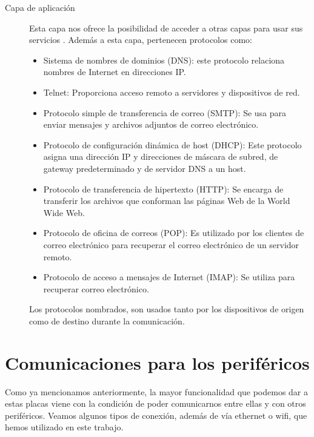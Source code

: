 \begin{description}
\item[Capa de aplicación]
Esta capa nos ofrece la posibilidad de acceder a otras capas para usar sus servicios \cite{protocolosAplicacion}. Además a esta capa, pertenecen protocolos como:
\begin{itemize}
\item Sistema de nombres de dominios (DNS): este protocolo relaciona nombres de Internet en direcciones IP.
\item Telnet: Proporciona acceso remoto a servidores y dispositivos de red.
\item Protocolo simple de transferencia de correo (SMTP): Se usa para enviar mensajes y archivos adjuntos de correo electrónico.
\item Protocolo de configuración dinámica de host (DHCP): Este protocolo asigna una dirección IP y direcciones de máscara de subred, de gateway predeterminado y de servidor DNS a un host.
\item Protocolo de transferencia de hipertexto (HTTP): Se encarga de transferir los archivos que conforman las páginas Web de la World Wide Web.
\item Protocolo de oficina de correos (POP): Es utilizado por los clientes de correo electrónico para recuperar el correo electrónico de un servidor remoto.
\item Protocolo de acceso a mensajes de Internet (IMAP): Se utiliza para recuperar correo electrónico.
\end{itemize}
Los protocolos nombrados, son usados tanto por los dispositivos de origen como de destino durante la comunicación.
\end{description}


\section{Comunicaciones para los periféricos}
Como ya mencionamos anteriormente, la mayor funcionalidad que podemos dar a estas placas viene con la condición de poder comunicarnos entre ellas y con otros periféricos. Veamos algunos tipos de conexión, además de vía ethernet o wifi, que hemos utilizado en este trabajo.

